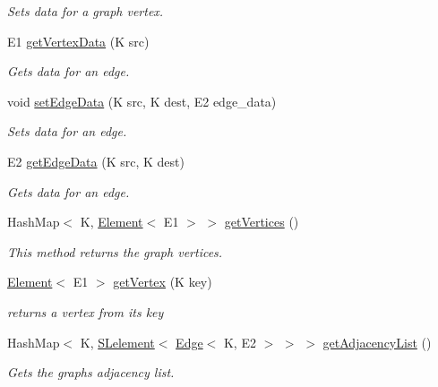 \begin{DoxyCompactItemize}
\begin{DoxyCompactList}\small\item\em Sets data for a graph vertex. \end{DoxyCompactList}\item 
E1 \mbox{\hyperlink{classbridges_1_1base_1_1_graph_adj_list_a3d5f73795bcd5011c425eaca33383454}{get\+Vertex\+Data}} (K src)
\begin{DoxyCompactList}\small\item\em Gets data for an edge. \end{DoxyCompactList}\item 
void \mbox{\hyperlink{classbridges_1_1base_1_1_graph_adj_list_a48041b13b10d5fb677f48a0debfc268e}{set\+Edge\+Data}} (K src, K dest, E2 edge\+\_\+data)
\begin{DoxyCompactList}\small\item\em Sets data for an edge. \end{DoxyCompactList}\item 
E2 \mbox{\hyperlink{classbridges_1_1base_1_1_graph_adj_list_a13cdc7ed89fb211f47e2b04da0b65561}{get\+Edge\+Data}} (K src, K dest)
\begin{DoxyCompactList}\small\item\em Gets data for an edge. \end{DoxyCompactList}\item 
Hash\+Map$<$ K, \mbox{\hyperlink{classbridges_1_1base_1_1_element}{Element}}$<$ E1 $>$ $>$ \mbox{\hyperlink{classbridges_1_1base_1_1_graph_adj_list_acd53b2393db0936ad5812997f67ee1ee}{get\+Vertices}} ()
\begin{DoxyCompactList}\small\item\em This method returns the graph vertices. \end{DoxyCompactList}\item 
\mbox{\hyperlink{classbridges_1_1base_1_1_element}{Element}}$<$ E1 $>$ \mbox{\hyperlink{classbridges_1_1base_1_1_graph_adj_list_aa19cd300a85b05352bdf58720310a112}{get\+Vertex}} (K key)
\begin{DoxyCompactList}\small\item\em returns a vertex from its key \end{DoxyCompactList}\item 
Hash\+Map$<$ K, \mbox{\hyperlink{classbridges_1_1base_1_1_s_lelement}{S\+Lelement}}$<$ \mbox{\hyperlink{classbridges_1_1base_1_1_edge}{Edge}}$<$ K, E2 $>$ $>$ $>$ \mbox{\hyperlink{classbridges_1_1base_1_1_graph_adj_list_a77771e356aa8bf44525be9ae01603989}{get\+Adjacency\+List}} ()
\begin{DoxyCompactList}\small\item\em Gets the graph\textquotesingle{}s adjacency list. \end{DoxyCompactList}\item 

\end{DoxyCompactItemize}
